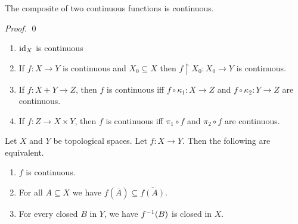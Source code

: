 \begin{prop}
The composite of two continuous functions is continuous.
\end{prop}

\begin{proof}
\pf
{}
\qed
\end{proof}

\begin{prop}
\begin{enumerate}
\item $\mathrm{id}_{X}$ is continuous
\item If $f : X \rightarrow Y$ is continuous and $X_0 \subseteq X$ then $f \restriction X_0 : X_0 \rightarrow Y$ is continuous.
\item If $f : X + Y \rightarrow Z$, then $f$ is continuous iff $f \circ \kappa_1 : X \rightarrow Z$ and $f \circ \kappa_2 : Y \rightarrow Z$ are continuous.
\item If $f : Z \rightarrow X \times Y$, then $f$ is continuous iff $\pi_1 \circ f$ and $\pi_2 \circ f$ are continuous.
\end{enumerate}
\end{prop}

\begin{prop}
Let $X$ and $Y$ be topological spaces. Let $f : X \rightarrow Y$. Then the following are equivalent.
\begin{enumerate}
\item $f$ is continuous.
\item For all $A \subseteq X$ we have $f(\overline{A}) \subseteq \overline{f(A)}$.
\item For every closed $B$ in $Y$, we have ${f}^{-1}(B)$ is closed in $X$.
\end{enumerate}
\end{prop}

